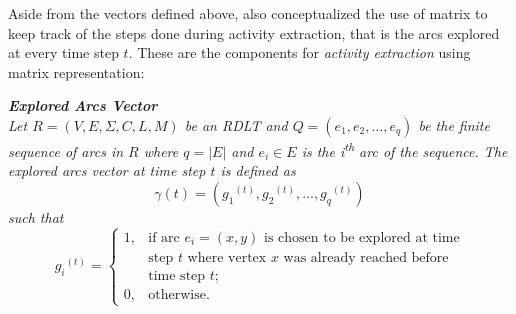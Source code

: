     Aside from the vectors defined above, \cite{KarenRoben2018} also conceptualized the use of matrix to keep track of the steps done during activity extraction, that is the arcs explored at every time step $t$. These are the components for \emph{activity extraction} using matrix representation:

\begin{defn}\label{def:explored_vector}
    \textit{\textbf{Explored Arcs Vector}\\
    Let $R = (V, E, \Sigma, C, L, M)$ be an RDLT and $Q = (e_{1}, e_{2}, \ldots, e_{q})$ be the finite sequence of arcs in $R$ where $q = |E|$ and $e_{i} \in E$ is the i\textsuperscript{th} arc of the sequence. The explored arcs vector at time step $t$ is defined as
    \begin{displaymath}
    \gamma(t) = ({g_{1}}^{(t)}, {g_{2}}^{(t)}, \ldots, {g_{q}}^{(t)})
    \end{displaymath}
    such that 
    \begin{displaymath}
    {g_{i}}^{(t)} = 
    \left\{
    \begin{array}{rl}
       1, &\text{if arc $e_{i} = (x,y)$ is chosen to be explored at time}\\
       &\text{step $t$ where vertex $x$ was already reached before}\\
       &\text{time step $t$;}\\
       0, &\text{otherwise.}
    \end{array}
    \right.
    \end{displaymath}}
    \end{defn}
    
    
